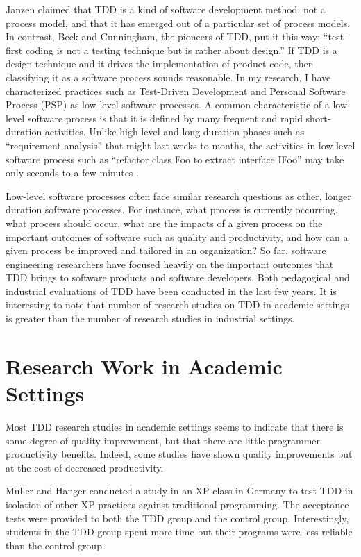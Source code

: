 Janzen \cite{Janzen:05} claimed that TDD is a kind of software development
method, not a process model, and that it has emerged out of a particular
set of process models. In contrast, Beck and Cunningham, the pioneers of
TDD, put it this way: ``test-first coding is not a testing technique but is
rather about design.''\cite{Beck:01} If TDD is a design technique and it
drives the implementation of product code, then classifying it as a
software process sounds reasonable. In my research, I have characterized
practices such as Test-Driven Development and Personal Software Process
(PSP) as low-level software processes. A common characteristic of a low-level
software process is that it is defined by many frequent and rapid
short-duration activities. Unlike high-level and long duration phases such
as ``requirement analysis'' that might last weeks to months, the activities
in low-level software process such as ``refactor class Foo to extract
interface IFoo'' may take only seconds to a few minutes \cite{csdl2-06-02}.

Low-level software processes often face similar research questions as
other, longer duration software processes. For instance, what process is
currently occurring, what process should occur, what are the impacts of a
given process on the important outcomes of software such as quality and
productivity, and how can a given process be improved and tailored in an
organization? So far, software engineering researchers have focused heavily
on the important outcomes that TDD brings to software products and software
developers. Both pedagogical
\cite{Muller:02,Edwards:04,Geras:04,Matjaz:03,Erdogmus:05,Kaufmann:03} and
industrial \cite{George:03,Maximilien:03,Bhat:06} evaluations of TDD have
been conducted in the last few years.  It is interesting to note that number of
research studies on TDD in academic settings is greater than the number of
research studies in industrial settings.

\section{Research Work in Academic Settings}
Most TDD research studies in academic settings seems to indicate that there
is some degree of quality improvement, but that there are little programmer
productivity benefits. Indeed, some studies have shown quality improvements
but at the cost of decreased productivity.

Muller and Hanger \cite{Muller:02} conducted a study in an XP class in
Germany to test TDD in isolation of other XP practices against traditional
programming.  The acceptance tests were provided to both the TDD group and
the control group. Interestingly, students in the TDD group spent more time
but their programs were less reliable than the control group.  

